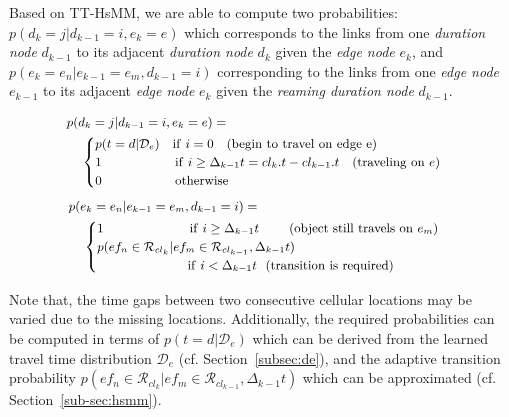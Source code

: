 \documentclass{vldb}
\begin{document}
	Based on TT-HsMM, we are able to compute two probabilities: $p(d_k=j|d_{k-1}=i, e_k=e)$ which corresponds to the links from one {\it duration node} $d_{k-1}$  to its adjacent {\it duration node} $d_k$ given the {\it edge node} $e_k$,  and $p(e_k=e_n|e_{k-1}=e_m, d_{k-1}=i)$ corresponding to the links from one {\it edge node} $e_{k-1}$ to its adjacent {\it edge node} $e_k$ given the {\it reaming duration node} $d_{k-1}$.
	
	\vspace{-15pt}
	\begin{equation*}
	\small
	\begin{multlined}
	p(d_k=j|d_{k-1}=i, e_k=e) = \\
	\begin{cases}
	p(t=d|\mathcal{D}_e)~~~\mathrm{if}\ i=0
	~~~(\mathrm{begin\ to\ travel\ on\ edge\ e})\\
	1~~~~~~~~~~~~~~~~~\mathrm{if}\ i\geq \Delta_{k-1}t=cl_k.t- cl_{k-1}.t
	~~~(\mathrm{traveling\ on\ }e)\\
	0~~~~~~~~~~~~~~~~~\mathrm{otherwise}
	\end{cases}
	\end{multlined}
	\end{equation*}
	\begin{equation*}
	\small
	\begin{multlined}
	p(e_k=e_n|e_{k-1}=e_m, d_{k-1}=i) = \\
	\begin{cases}
	1~~~~~~~~~~~~~~~~~~~~\mathrm{if}\ i\geq \Delta_{k-1}t\ ~~~~~~(\mathrm{object\  still\ travels\ on\ }e_m)\\
	p(ef_n\in \mathcal{R}_{cl_k}|ef_m\in \mathcal{R}_{cl_{k-1}},\Delta_{k-1} t) \\
	~~~~~~~~~~~~~~~~~~~~~\mathrm{if}\ i<\Delta_{k-1} t 
	~~(\mathrm{transition\ is\ required})
	\end{cases}
	\end{multlined}
	\end{equation*}
	
	Note that, the time gaps between two consecutive cellular locations may be varied due to the missing locations.
	Additionally, the required probabilities can be computed in terms of $p(t=d|\mathcal{D}_e)$ which can be derived from the learned travel time distribution $\mathcal{D}_e$ (cf. Section~\ref{subsec:de}), and the adaptive transition probability $p(ef_n\in \mathcal{R}_{cl_k}|ef_m\in \mathcal{R}_{cl_{k-1}},\Delta_{k-1} t)$ which can be approximated (cf. Section~\ref{sub-sec:hsmm}).
	
\end{document}

